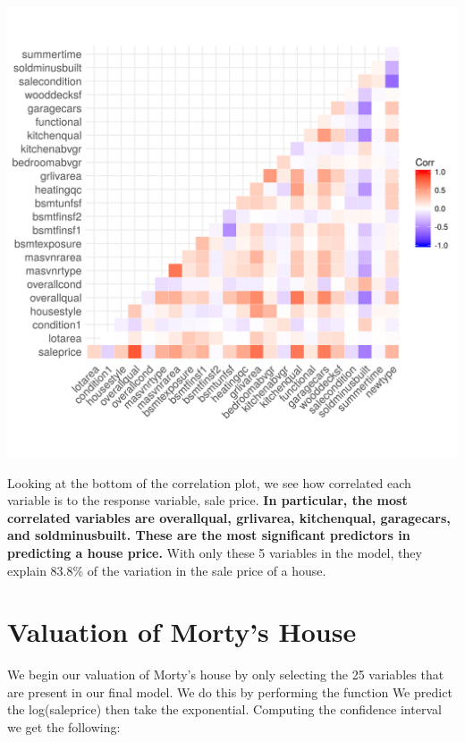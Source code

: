 \documentclass[12pt]{article}
\begin{document}
\begin{flushleft}
\begin{flushleft}
\centering
    \vspace*{0.5 cm}
    \includegraphics[scale = 1]{plot4.png}\\[1.0 cm]	
\begin{flushleft}

Looking at the bottom of the correlation plot, we see how correlated each variable is to the response variable, sale price. \textbf{In particular, the most correlated variables are overallqual, grlivarea,
kitchenqual, garagecars, and soldminusbuilt. These are the most significant predictors in predicting a house price.} With only these 5 variables in the model, they explain 83.8\% of the variation in the sale price of a house.
\end{flushleft}

\section{Valuation of Morty's House}

\begin{flushleft}

We begin our valuation of Morty's house by only selecting the 25 variables that are present in our final model. We do this by performing the function We predict the log(saleprice) then take the exponential. Computing the confidence interval we get the following: 


\end{flushleft}
\end{flushleft}
\end{flushleft}
\end{document}
